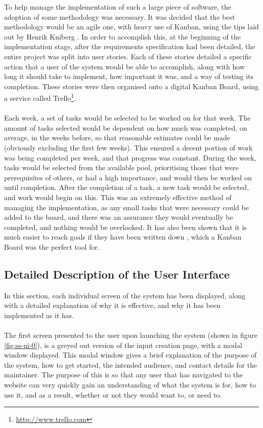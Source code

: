 To help manage the implementation of such a large piece of software, the adoption of some methodology was necessary. It was decided that the best methodology would be an agile one, with heavy use of Kanban, using the tips laid out by Henrik Kniberg \cite{kniberg2007scrum}. In order to accomplish this, at the beginning of the implementation stage, after the requirements specification had been detailed, the entire project was split into user stories. Each of these stories detailed a specific action that a user of the system would be able to accomplish, along with how long it should take to implement, how important it was, and a way of testing its completion. These stories were then organised onto a digital Kanban Board, using a service called Trello\footnote{\url{http://www.trello.com}}. \ \\
\ \\
Each week, a set of tasks would be selected to be worked on for that week. The amount of tasks selected would be dependent on how much was completed, on average, in the weeks before, so that reasonable estimates could be made (obviously excluding the first few weeks). This ensured a decent portion of work was being completed per week, and that progress was constant. During the week, tasks would be selected from the available pool, prioritising those that were prerequisites of others, or had a high importance, and would then be worked on until completion. After the completion of a task, a new task would be selected, and work would begin on this. This was an extremely effective method of managing the implementation, as any small tasks that were necessary could be added to the board, and there was an assurance they would eventually be completed, and nothing would be overlooked. It has also been shown that it is much easier to reach goals if they have been written down \cite{wilson2008goal}, which a Kanban Board was the perfect tool for.

\newpage 
\subsection{Detailed Description of the User Interface}
In this section, each individual screen of the system has been displayed, along with a detailed explanation of why it is effective, and why it has been implemented as it has.\ \\
\ \\
The first screen presented to the user upon launching the system (shown in figure \ref{fig:ss-ui-0}), is a greyed out version of the input creation page, with a modal window displayed. This modal window gives a brief explanation of the purpose of the system, how to get started, the intended audience, and contact details for the maintainer. The purpose of this is so that any user that has navigated to the website can very quickly gain an understanding of what the system is for, how to use it, and as a result, whether or not they would want to, or need to.


